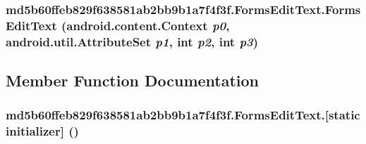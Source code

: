 \hypertarget{classmd5b60ffeb829f638581ab2bb9b1a7f4f3f_1_1_forms_edit_text_996753e5fb96d9610865be8c3c540ce9}{
\subsubsection[{FormsEditText}]{\setlength{\rightskip}{0pt plus 5cm}md5b60ffeb829f638581ab2bb9b1a7f4f3f.FormsEditText.FormsEditText (android.content.Context {\em p0}, \/  android.util.AttributeSet {\em p1}, \/  int {\em p2}, \/  int {\em p3})}}
\label{classmd5b60ffeb829f638581ab2bb9b1a7f4f3f_1_1_forms_edit_text_996753e5fb96d9610865be8c3c540ce9}




\subsection{Member Function Documentation}
\hypertarget{classmd5b60ffeb829f638581ab2bb9b1a7f4f3f_1_1_forms_edit_text_ebbff071dc8577936adfdc4ac285f1db}{
\subsubsection[{[static initializer]}]{\setlength{\rightskip}{0pt plus 5cm}md5b60ffeb829f638581ab2bb9b1a7f4f3f.FormsEditText.\mbox{[}static initializer\mbox{]} ()}}
\label{classmd5b60ffeb829f638581ab2bb9b1a7f4f3f_1_1_forms_edit_text_ebbff071dc8577936adfdc4ac285f1db}





